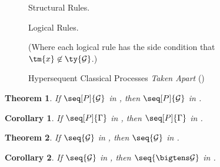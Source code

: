 \documentclass[submission,copyright,creativecommons]{eptcs}
\newtheorem{theorem}{Theorem}
\newtheorem{corollary}{Corollary}
\begin{document}
\begin{figure*}[!htb]
  Structural Rules.
  \begin{center} \hccpInfAx        \hccpInfCycle \end{center}
  \begin{center} \hccpInfMix       \hccpInfHalt  \end{center}

  Logical Rules.

  \begin{center} \hccpInfBoundTens \hccpInfParr  \end{center}
  \begin{center} \hccpInfOne       \hccpInfBot   \end{center}
  \begin{center}       \end{center}
  \begin{center} \hccpInfWith                    \end{center}
  \begin{center} \hccpInfNil       \hccpInfTop   \end{center}

  \centering
  (Where each logical rule has the side condition that $\tm{x} \not\in \ty{\mathcal{G}}$.)

  \caption{Hypersequent Classical Processes \emph{Taken Apart} (\hccp)}
  \label{fig:hccp}
\end{figure*}

\begin{theorem}\label{cor:hcp2hccp-typing}
  If $\seq[P]{\mathcal{G}}$ in \hcp, then $\seq[P]{\mathcal{G}}$ in \hccp.
\end{theorem}
\begin{corollary}\label{thm:cp2hccp-typing}
  If $\seq[P]{\Gamma}$ in \cp, then $\seq[P]{\Gamma}$ in \hccp. 
\end{corollary}
\begin{theorem}\label{thm:hccp2hcp-typing}
  If $\seq{\mathcal{G}}$ in \hccp, then $\seq{\mathcal{G}}$ in \hcp.
\end{theorem}
\begin{corollary}\label{cor:hccp2cp-typing}
  If $\seq{\mathcal{G}}$ in \hccp, then $\seq{\bigtens\mathcal{G}}$ in \cp.
\end{corollary}




\end{document}
